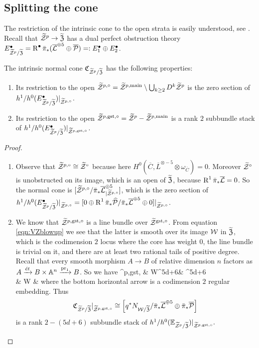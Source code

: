 \subsection{Splitting the cone} The restriction of the intrinsic cone to the open strata is easily understood, see \cite[Lemma 4.3]{CLpfields}. Recall that $\widetilde{\mathcal Z}^p\rightarrow\widetilde{\mathfrak Z}$ has a dual perfect obstruction theory $E^{\bullet}_{\widetilde{\mathcal Z}^p/\widetilde{\mathfrak Z}}=\operatorname{R}^{\bullet}\bar\pi_*(\overline{\mathcal{L}}^{\oplus 5}\oplus\overline{\mathcal P})=:E^{\bullet}_1\oplus E^{\bullet}_2$.
\begin{lem}\label{lem:open_cones}
The intrinsic normal cone $\mathfrak{C}_{\widetilde{\mathcal Z}^p/\widetilde{\mathfrak Z}}$ has the following properties:
\begin{enumerate}
\item Its restriction to the open $\widetilde{\mathcal Z}^{p,\circ}= \widetilde{\mathcal Z}^{p,\rm{main}}\setminus \bigcup_{k\geq 2}D^k \widetilde{\mathcal Z}^p$ is the zero section of $h^1/h^0(E^{\bullet}_{\widetilde{\mathcal Z}^p/\widetilde{\mathfrak Z}})\rvert_{\widetilde{\mathcal Z}^{p,\circ}}$.
\item Its restriction to the open $\widetilde{\mathcal Z}^{p,\rm{gst},\circ}=\widetilde{\mathcal Z}^p - \widetilde{\mathcal Z}^{p,\rm{main}}$  is a rank $2$ subbundle stack of $h^1/h^0(E^{\bullet}_{\widetilde{\mathcal Z}^p/\widetilde{\mathfrak Z}})\rvert_{\widetilde{\mathcal Z}^{p,\rm{gst},\circ}}$.
\end{enumerate}
\end{lem}
\begin{proof}\begin{enumerate}[leftmargin=.8cm]
\item Observe that $\widetilde{\mathcal Z}^{p,\circ}\cong \widetilde{\mathcal Z}^{\circ}$ because here $H^0(\overline{C}, \overline{L}^{\otimes -5}\otimes \omega_{\overline{C}})=0$. Moreover $\widetilde{\mathcal Z}^{\circ}$ is unobstructed on its image, which is an open of $\widetilde{\mathfrak Z}$, because $\operatorname{R}^1\bar{\pi}_*\overline{\mathcal{L}}=0$.
So the normal cone is $[\widetilde{\mathcal Z}^{p,\circ}/\bar{\pi}_*\overline{\mathcal{L}}^{\oplus 5}_{\rvert\widetilde{\mathcal Z}^{p,\circ}}]$, which is the zero section of $h^1/h^0(E^{\bullet}_{\widetilde{\mathcal Z}^p/\widetilde{\mathfrak Z}})\rvert_{\widetilde{\mathcal Z}^{p,\circ}}=[0\oplus \operatorname{R}^1\bar{\pi}_*\widehat{\mathcal P}/\bar{\pi}_*\overline{\mathcal{L}}^{\oplus 5}\oplus 0]\rvert_{\widetilde{\mathcal Z}^{p,\circ}}$.

\item We know that $\widetilde{\mathcal Z}^{p,\rm{gst},\circ}$ is a line bundle over $\widetilde{\mathcal Z}^{\rm{gst},\circ}$. From equation \ref{eqn:VZblowup} we see that the latter is smooth over its image $\mathcal W$ in $\widetilde{\mathfrak Z}$, which is the codimension $2$ locus where the core has weight $0$, the line bundle is trivial on it, and there are at least two rational tails of positive degree. Recall that every smooth morphism $A\to B$ of relative dimension $n$ factors as $A\xrightarrow{\acute{e}t} B\times \mathbb{A}^n\xrightarrow{\operatorname{pr}_1} B$. So we have
\bcd
\tZ^{p,\rm{gst},\circ} \ar[r,"\acute{e}t"] & \pazocal W\times\Aaff^{5d+6}\ar[r,hook]\ar[d,"q"] & \tXP\times \Aaff^{5d+6}\ar[d] \\
& \pazocal W \ar[r,hook] & \tXP
\ecd
where the bottom horizontal arrow is a codimension $2$ regular embedding. Thus 
\[\mathfrak{C}_{\widetilde{\mathcal Z}^p/\widetilde{\mathfrak Z}}\rvert_{\widetilde{\mathcal Z}^{p,\rm{gst},\circ}}\cong \left[ q^* N_{\mathcal W/\widetilde{\mathfrak Z}}/ \bar{\pi}_*\overline{\mathcal{L}}^{\oplus 5}\oplus\bar{\pi}_*\overline{\mathcal P}\right]\]
is a rank $2-(5d+6)$ subbundle stack of  $h^1/h^0(\mathbb E_{\widetilde{\mathcal Z}^p/\widetilde{\mathfrak Z}})\rvert_{\widetilde{\mathcal Z}^{p,\rm{gst},\circ}}.$
\end{enumerate}
\end{proof}
